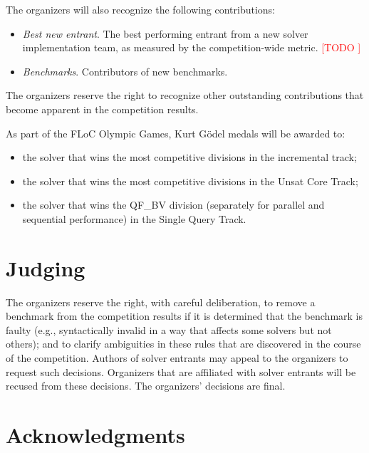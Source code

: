 \documentclass[12pt]{article}
\newcommand{\rem}[1]{\textcolor{red}{[#1]}}
\newcommand{\todo}[1]{\rem{TODO #1}}
\newcommand{\maintrack}{Single Query Track\xspace}
\newcommand{\ucoretrack}{Unsat Core Track\xspace}
\begin{document}
The organizers will also recognize the following contributions:
%
\begin{itemize}
\item \emph{Best new entrant}. The best performing entrant from a new
  solver implementation team, as measured by the competition-wide
    metric. \todo{}
\item \emph{Benchmarks}. Contributors of new benchmarks.
\end{itemize}
%
The organizers reserve the right to recognize other outstanding
contributions that become apparent in the competition results.

As part of the FLoC Olympic Games, Kurt G{\"o}del medals will be
awarded to:
%
\begin{itemize}
\item the solver that wins the most competitive divisions in the
  incremental track;
\item the solver that wins the most competitive divisions in the
  \ucoretrack;
\item the solver that wins the QF\_BV division (separately for
  parallel and sequential performance) in the \maintrack.
\end{itemize}


\section{Judging}

The organizers reserve the right, with careful deliberation, to remove
a benchmark from the competition results if it is determined that the
benchmark is faulty (e.g., syntactically invalid in a way that affects
some solvers but not others); and to clarify ambiguities in these
rules that are discovered in the course of the competition.  Authors
of solver entrants may appeal to the organizers to request such
decisions.  Organizers that are affiliated with solver entrants will
be recused from these decisions.  The organizers' decisions are final.


\section{Acknowledgments}
\end{document}
